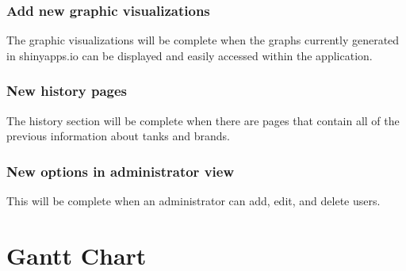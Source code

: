 \documentclass[draftclsnofoot,onecolumn,journal,letterpaper,compsoc,10pt]{IEEEtran}
\begin{document}
        \subsubsection{Add new graphic visualizations}
            The graphic visualizations will be complete when the graphs currently generated in shinyapps.io can be displayed and easily accessed within the application.
        \subsubsection{New history pages}
            The history section will be complete when there are pages that contain all of the previous information about tanks and brands.
        \subsubsection{New options in administrator view}
            This will be complete when an administrator can add, edit, and delete users.

    \section{Gantt Chart}
    
\end{document}
